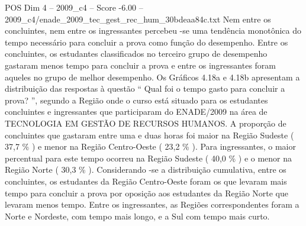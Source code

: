 \begin{textsample}{POS Dim 4 – 2009\_c4 – Score -6.00 – 2009\_c4/enade\_2009\_tec\_gest\_rec\_hum\_30bdeaa84c.txt}
Nem entre os concluintes, nem entre os ingressantes percebeu -se uma tendência monotônica do tempo necessário para concluir a prova como função do desempenho.
Entre os concluintes, os estudantes classificados no terceiro grupo de desempenho gastaram menos tempo para concluir a prova e entre os ingressantes foram aqueles no grupo de melhor desempenho.
Os Gráficos 4.18a e 4.18b apresentam a distribuição das respostas à questão “ Qual foi o tempo gasto para concluir a prova? ”, segundo a Região onde o curso está situado para os estudantes concluintes e ingressantes que participaram do ENADE/2009 na área de TECNOLOGIA EM GESTÃO DE RECURSOS HUMANOS.
A proporção de concluintes que gastaram entre uma e duas horas foi maior na Região Sudeste ( 37,7 \% ) e menor na Região Centro-Oeste ( 23,2 \% ).
Para ingressantes, o maior percentual para este tempo ocorreu na Região Sudeste ( 40,0 \% ) e o menor na Região Norte ( 30,3 \% ).
Considerando -se a distribuição cumulativa, entre os concluintes, os estudantes da Região Centro-Oeste foram os que levaram mais tempo para concluir a prova por oposição aos estudantes da Região Norte que levaram menos tempo.
Entre os ingressantes, as Regiões correspondentes foram a Norte e Nordeste, com tempo mais longo, e a Sul com tempo mais curto.

\end{textsample}
